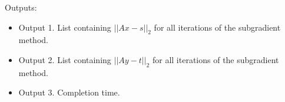 \documentclass[12pt]{article}
\begin{document}
Outputs:
\begin{itemize}
	\item Output 1. List containing $||Ax-s||_2$ for all iterations of the subgradient method.
	\item Output 2. List containing $||Ay-t||_2$ for all iterations of the subgradient method.
	\item Output 3. Completion time.
\end{itemize}
\end{document}
